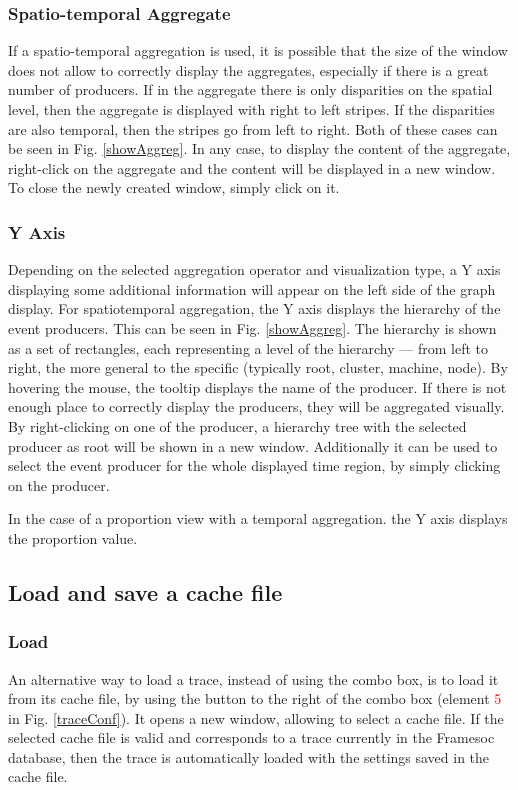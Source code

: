 \documentclass[twoside]{article}
\begin{document}
\begin{sloppypar}
\subsubsection{Spatio-temporal Aggregate}
If a spatio-temporal aggregation is used, it is possible that the size of the window does not allow to correctly display the aggregates, especially if there is a great number of producers. If in the aggregate there is only disparities on the spatial level, then the aggregate is displayed with right to left stripes. If the disparities are also temporal, then the stripes go from left to right. Both of these cases can be seen in Fig. \ref{showAggreg}. In any case, to display the content of the aggregate, right-click on the aggregate and the content will be displayed in a new window. To close the newly created window, simply click on it.

\subsubsection{Y Axis}
Depending on the selected aggregation operator and visualization type, a Y axis displaying some additional information will appear on the left side of the graph display. For spatiotemporal aggregation, the Y axis displays the hierarchy of the event producers. This can be seen in Fig. \ref{showAggreg}. The hierarchy is shown as a set of rectangles, each representing a level of the hierarchy --- from left to right, the more general to the specific (typically root, cluster, machine, node). By hovering the mouse, the tooltip displays the name of the producer. If there is not enough place to correctly display the producers, they will be aggregated visually. By right-clicking on one of the producer, a hierarchy tree with the selected producer as root will be shown in a new window. Additionally it can be used to select the event producer for the whole displayed time region, by simply clicking on the producer.

In the case of a proportion view with a temporal aggregation. the Y axis displays the proportion value.

\subsection{Load and save a cache file}
\subsubsection{Load}
An alternative way to load a trace, instead of using the combo box, is to load it from its cache file, by using the button to the right of the combo box (element \textcolor{red}{5} in Fig. \ref{traceConf}). It opens a new window, allowing to select a cache file. If the selected cache file is valid and corresponds to a trace currently in the Framesoc database, then the trace is automatically loaded with the settings saved in the cache file.


\end{sloppypar}
\end{document}

